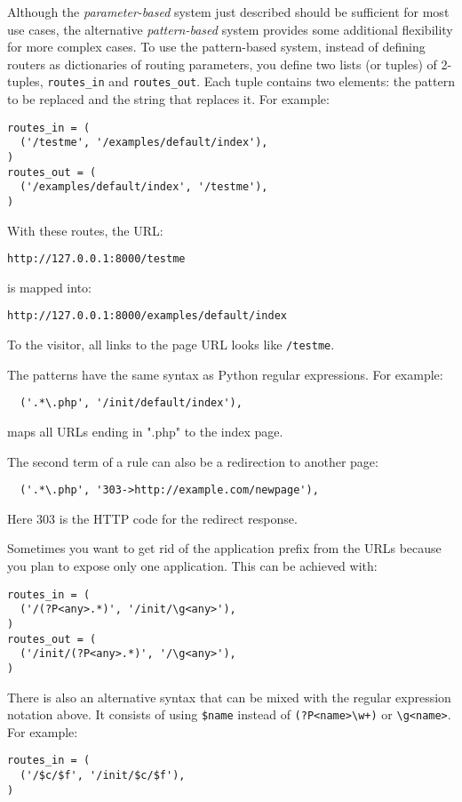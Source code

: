 \documentclass[justified,sixbynine,notoc]{tufte-book}
\def\ft{\small\tt}
\begin{document}
\begin{fullwidth}
Although the {\it parameter-based} system just described should be sufficient for most use cases, the alternative {\it pattern-based} system provides some additional flexibility for more complex cases. To use the pattern-based system, instead of defining routers as dictionaries of routing parameters, you define two lists (or tuples) of 2-tuples, {\ft routes\_in} and {\ft routes\_out}. Each tuple contains two elements: the pattern to be replaced and the string that replaces it. For example:
\begin{lstlisting}
routes_in = (
  ('/testme', '/examples/default/index'),
)
routes_out = (
  ('/examples/default/index', '/testme'),
)
\end{lstlisting}

With these routes, the URL:
\begin{lstlisting}[keywords={}]
http://127.0.0.1:8000/testme
\end{lstlisting}
\noindent is mapped into:
\begin{lstlisting}[keywords={}]
http://127.0.0.1:8000/examples/default/index
\end{lstlisting}

To the visitor, all links to
the page URL looks like {\ft /testme}.

The patterns have the same syntax as Python regular expressions. For example:
\begin{lstlisting}
  ('.*\.php', '/init/default/index'),
\end{lstlisting}
\noindent maps all URLs ending in ".php" to the index page.

The second term of a rule can also be a redirection to another page:
\begin{lstlisting}
  ('.*\.php', '303->http://example.com/newpage'),
\end{lstlisting}

Here 303 is the HTTP code for the redirect response.

Sometimes you want to get rid of the application prefix from the URLs because you plan to expose only one application. This can be achieved with:
\begin{lstlisting}
routes_in = (
  ('/(?P<any>.*)', '/init/\g<any>'),
)
routes_out = (
  ('/init/(?P<any>.*)', '/\g<any>'),
)
\end{lstlisting}

There is also an alternative syntax that can be mixed with the regular expression notation above. It consists of using {\ft \$name} instead of {\ft (?P<name>{\textbackslash}w+)} or {\ft {\textbackslash}g<name>}. For example:
\begin{lstlisting}
routes_in = (
  ('/$c/$f', '/init/$c/$f'),
)


\end{lstlisting}
\end{fullwidth}
\end{document}
